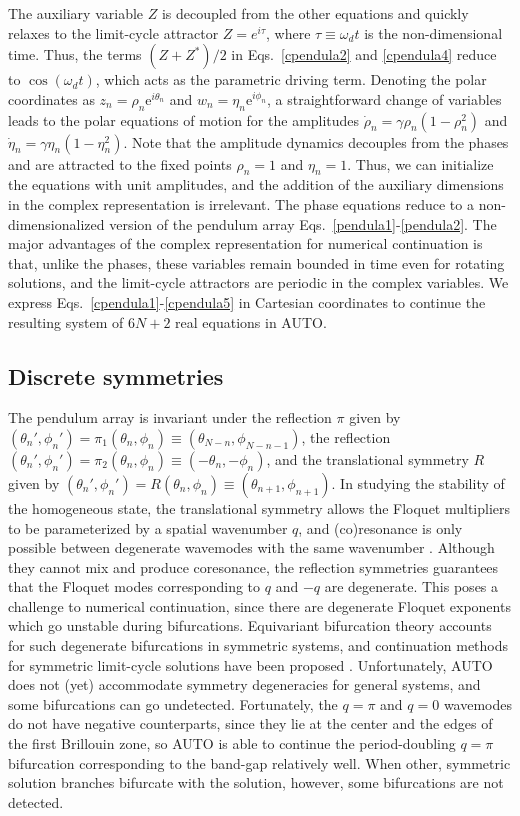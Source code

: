 \documentclass[aps,pre,amsmath,amssymb,floatfix,onecolumn,notitlepage,10pt]{revtex4-1}
\begin{document}
The auxiliary variable $Z$ is decoupled from the other equations and quickly relaxes to the limit-cycle attractor $Z=e^{i\tau}$, where $\tau\equiv \omega_d t$ is the non-dimensional time. Thus, the terms $(Z+Z^*)/2$ in Eqs.~\eqref{cpendula2} and \eqref{cpendula4} reduce to $\cos (\omega_d t)$, which acts as the parametric driving term. Denoting the polar coordinates as $z_n = \rho_n{\mathrm e}^{i\theta_n}$ and $w_n = \eta_n{\mathrm e}^{i\phi_n}$, a straightforward change of variables leads to the polar equations of motion for the amplitudes $\dot \rho_n = \gamma \rho_n \left(1-\rho_n^2\right)$ and$\dot \eta_n =  \gamma \eta_n \left(1-\eta_n^2\right)$. Note that the amplitude dynamics decouples from the phases and are attracted to the fixed points $\rho_n=1$ and $\eta_n=1$.  Thus, we can initialize the equations with unit amplitudes, and the addition of the auxiliary dimensions in the complex representation is irrelevant.  The phase equations reduce to a non-dimensionalized version of the pendulum array Eqs.~\eqref{pendula1}-\eqref{pendula2}. The major advantages of the complex representation for numerical continuation is that, unlike the phases, these variables remain bounded in time even for rotating solutions, and the limit-cycle attractors are periodic in the complex variables. We express Eqs.~\eqref{cpendula1}-\eqref{cpendula5} in Cartesian coordinates to continue the resulting system of $6N+2$ real equations in AUTO.

\subsection{Discrete symmetries}
The pendulum array is invariant under the reflection $\pi$ given by $(\theta_n',\phi_n') = \pi_1(\theta_n,\phi_n) \equiv (\theta_{N-n},\phi_{N-n-1})$, the reflection $(\theta_n',\phi_n') = \pi_2(\theta_n,\phi_n) \equiv (-\theta_{n},-\phi_{n})$, and the translational symmetry $R$ given by $(\theta_n',\phi_n')=R(\theta_n,\phi_n)\equiv(\theta_{n+1},\phi_{n+1})$. In studying the stability of the homogeneous state, the translational symmetry allows the Floquet multipliers to be parameterized by a spatial wavenumber $q$, and (co)resonance is only possible between degenerate wavemodes with the same wavenumber \cite{2021_Nicolaou_2}. Although they cannot mix and produce coresonance, the reflection symmetries guarantees that the Floquet modes corresponding to $q$ and $-q$ are degenerate. This poses a challenge to numerical continuation, since there are degenerate Floquet exponents which go unstable during bifurcations. Equivariant bifurcation theory accounts for such degenerate bifurcations in symmetric systems, and continuation methods for symmetric limit-cycle solutions have been proposed \cite{2006_Wulff}. Unfortunately, AUTO does not (yet) accommodate symmetry degeneracies for general systems, and some bifurcations can go undetected.  Fortunately, the $q=\pi$ and $q=0$ wavemodes do not have negative counterparts, since they lie at the center and the edges of the first Brillouin zone, so AUTO is able to continue the period-doubling $q=\pi$ bifurcation corresponding to the band-gap relatively well. When other, symmetric solution branches bifurcate with the solution, however, some bifurcations are not detected.
\end{document}
